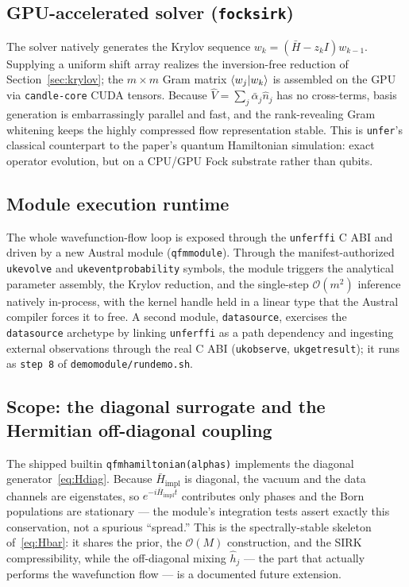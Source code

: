 \documentclass[11pt, a4paper]{article}
\begin{document}
\subsection{GPU-accelerated solver (\texttt{fock\textunderscore sirk})}

The solver natively generates the Krylov sequence $w_k=(\bar H-z_kI)w_{k-1}$.
Supplying a uniform shift array realizes the inversion-free reduction of
Section~\ref{sec:krylov}; the $m\times m$ Gram matrix $\braket{w_j|w_k}$ is
assembled on the GPU via \texttt{candle-core} CUDA tensors. Because
$\hat V=\sum_j\bar\alpha_j\hat n_j$ has no cross-terms, basis generation is
embarrassingly parallel and fast, and the rank-revealing Gram whitening keeps
the highly compressed flow representation stable. This is \texttt{unfer}'s
classical counterpart to the paper's quantum Hamiltonian simulation: exact
operator evolution, but on a CPU/GPU Fock substrate rather than qubits.

\subsection{Module execution runtime}

The whole wavefunction-flow loop is exposed through the
\texttt{unfer\textunderscore ffi} C ABI and driven by a new Austral module
(\texttt{qfm\textunderscore module}). Through the manifest-authorized
\texttt{uk\textunderscore evolve} and
\texttt{uk\textunderscore event\textunderscore probability} symbols, the module
triggers the analytical parameter assembly, the Krylov reduction, and the
single-step $\mathcal{O}(m^2)$ inference natively in-process, with the kernel
handle held in a linear type that the Austral compiler forces it to free. A
second module, \texttt{data\textunderscore source}, exercises the
\texttt{data\textunderscore source} archetype by linking
\texttt{unfer\textunderscore ffi} as a path dependency and ingesting
external observations through the real C ABI (\texttt{uk\textunderscore observe},
\texttt{uk\textunderscore get\textunderscore result}); it runs as
\texttt{step~8} of \texttt{demo\textunderscore module/run\textunderscore demo.sh}.

\subsection{Scope: the diagonal surrogate and the Hermitian off-diagonal coupling}

The shipped builtin \texttt{qfm\textunderscore hamiltonian(alphas)} implements
the diagonal generator~\eqref{eq:Hdiag}. Because $\bar H_{\text{impl}}$ is
diagonal, the vacuum and the data channels are eigenstates, so
$e^{-i\bar H_{\text{impl}}t}$ contributes only phases and the Born populations
are stationary --- the module's integration tests assert exactly this
conservation, not a spurious ``spread.'' This is the spectrally-stable
skeleton of~\eqref{eq:Hbar}: it shares the prior, the $\mathcal{O}(M)$
construction, and the SIRK compressibility, while the off-diagonal mixing
$\hat h_j$ --- the part that actually performs the wavefunction flow --- is a
documented future extension.
\end{document}
